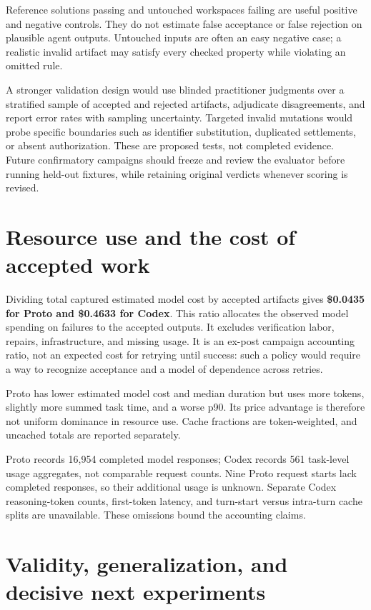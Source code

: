 Reference solutions passing and untouched workspaces failing are useful positive and negative controls. They do not estimate false acceptance or false rejection on plausible agent outputs. Untouched inputs are often an easy negative case; a realistic invalid artifact may satisfy every checked property while violating an omitted rule.

A stronger validation design would use blinded practitioner judgments over a stratified sample of accepted and rejected artifacts, adjudicate disagreements, and report error rates with sampling uncertainty. Targeted invalid mutations would probe specific boundaries such as identifier substitution, duplicated settlements, or absent authorization. These are proposed tests, not completed evidence. Future confirmatory campaigns should freeze and review the evaluator before running held-out fixtures, while retaining original verdicts whenever scoring is revised.

\section{Resource use and the cost of accepted work}\label{sec:7}



Dividing total captured estimated model cost by accepted artifacts gives \textbf{\$0.0435 for Proto and \$0.4633 for Codex}. This ratio allocates the observed model spending on failures to the accepted outputs. It excludes verification labor, repairs, infrastructure, and missing usage. It is an ex-post campaign accounting ratio, not an expected cost for retrying until success: such a policy would require a way to recognize acceptance and a model of dependence across retries.

Proto has lower estimated model cost and median duration but uses more tokens, slightly more summed task time, and a worse p90. Its price advantage is therefore not uniform dominance in resource use. Cache fractions are token-weighted, and uncached totals are reported separately.

Proto records 16,954 completed model responses; Codex records 561 task-level usage aggregates, not comparable request counts. Nine Proto request starts lack completed responses, so their additional usage is unknown. Separate Codex reasoning-token counts, first-token latency, and turn-start versus intra-turn cache splits are unavailable. These omissions bound the accounting claims.

\section{Validity, generalization, and decisive next experiments}\label{sec:8}


